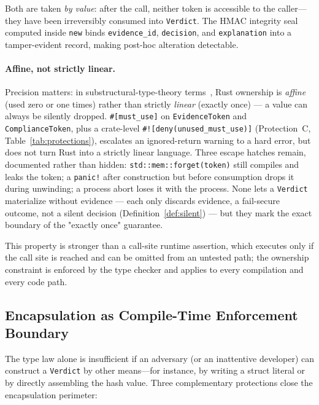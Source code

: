 Both are taken \emph{by value}: after the call, neither token is
accessible to the caller---they have been irreversibly consumed into
\texttt{Verdict}.
The HMAC integrity seal computed inside \texttt{new} binds
\texttt{evidence\_id}, \texttt{decision}, and \texttt{explanation}
into a tamper-evident record, making post-hoc alteration detectable.

\paragraph*{Affine, not strictly linear.}
Precision matters: in substructural-type-theory
terms~\cite{walker2005substructural,pierce2002tapl}, Rust ownership is
\emph{affine} (used zero or one times) rather than strictly
\emph{linear} (exactly once) --- a value can always be silently
dropped. \texttt{\#[must\_use]} on \texttt{EvidenceToken} and
\texttt{ComplianceToken}, plus a crate-level
\texttt{\#![deny(unused\_must\_use)]} (Protection~C,
Table~\ref{tab:protections}), escalates an ignored-return warning to a hard
error, but does not turn Rust into a strictly linear language.
Three escape hatches remain, documented rather than hidden:
\texttt{std::mem::forget(token)} still compiles and leaks the token;
a \texttt{panic!} after construction but before consumption drops it
during unwinding; a process abort loses it with the process. None lets
a \texttt{Verdict} materialize without evidence --- each only discards
evidence, a fail-secure outcome, not a silent decision
(Definition~\ref{def:silent}) --- but they mark the exact boundary of
the "exactly once" guarantee.

This property is stronger than a call-site runtime assertion, which
executes only if the call site is reached and can be omitted from an
untested path; the ownership constraint is enforced by the type
checker and applies to every compilation and every code path.

\subsection{Encapsulation as Compile-Time Enforcement Boundary}
\label{sec:encapsulation}

The type law alone is insufficient if an adversary (or an
inattentive developer) can construct a \texttt{Verdict} by other
means---for instance, by writing a struct literal or by directly
assembling the hash value.  Three complementary protections close
the encapsulation perimeter:

